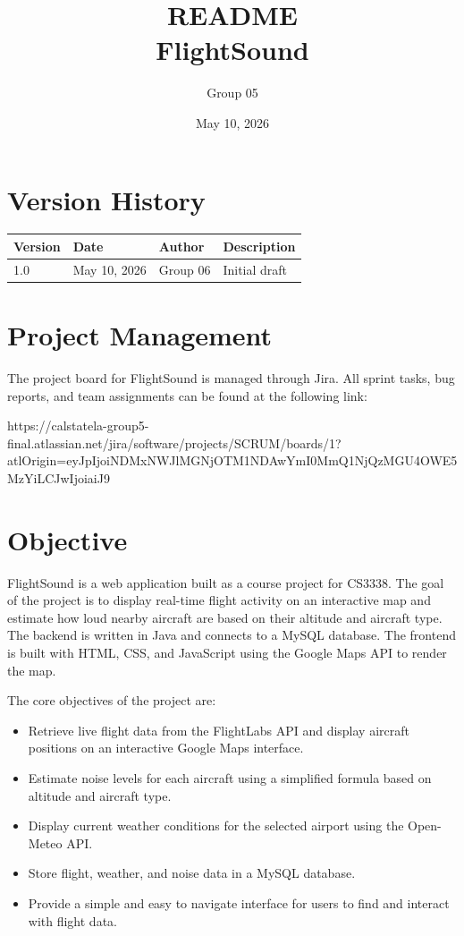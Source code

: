 \documentclass[12pt]{article}
\title{README\\FlightSound}
\author{Group 05}
\date{May 10, 2026}
\begin{document}
\maketitle
\newpage

\tableofcontents
\newpage

\section*{Version History}

\begin{tabular}{|l|l|l|l|}
\hline
Version & Date & Author & Description \\
\hline
1.0 & May 10, 2026 & Group 06 & Initial draft \\
\hline
\end{tabular}

\newpage

\section{Project Management}

The project board for FlightSound is managed through Jira. All sprint tasks, bug reports, and team assignments can be found at the following link:

https://calstatela-group5-final.atlassian.net/jira/software/projects/SCRUM/boards/1?atlOrigin=eyJpIjoiNDMxNWJlMGNjOTM1NDAwYmI0MmQ1NjQzMGU4OWE5MzYiLCJwIjoiaiJ9

\newpage

\section{Objective}

FlightSound is a web application built as a course project for CS3338. The goal of the project is to display real-time flight activity on an interactive map and estimate how loud nearby aircraft are based on their altitude and aircraft type. The backend is written in Java and connects to a MySQL database. The frontend is built with HTML, CSS, and JavaScript using the Google Maps API to render the map.

The core objectives of the project are:

\begin{itemize}
\item Retrieve live flight data from the FlightLabs API and display aircraft positions on an interactive Google Maps interface.
\item Estimate noise levels for each aircraft using a simplified formula based on altitude and aircraft type.
\item Display current weather conditions for the selected airport using the Open-Meteo API.
\item Store flight, weather, and noise data in a MySQL database.
\item Provide a simple and easy to navigate interface for users to find and interact with flight data.
\end{itemize}
\end{document}
